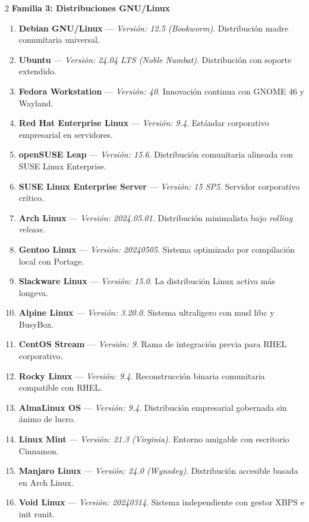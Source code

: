\documentclass[12pt]{article}
\begin{document}
\begin{multicols}{2}
\medskip
\noindent\textbf{Familia 3: Distribuciones GNU/Linux}\par\smallskip
\begin{enumerate}[label=\textbf{\arabic*.}, leftmargin=*, noitemsep, topsep=1pt, start=27]
    \item \textbf{Debian GNU/Linux} --- \textit{Versión: 12.5 (Bookworm)}. Distribución madre comunitaria universal.
    \item \textbf{Ubuntu} --- \textit{Versión: 24.04 LTS (Noble Numbat)}. Distribución con soporte extendido.
    \item \textbf{Fedora Workstation} --- \textit{Versión: 40}. Innovación continua con GNOME 46 y Wayland.
    \item \textbf{Red Hat Enterprise Linux} --- \textit{Versión: 9.4}. Estándar corporativo empresarial en servidores.
    \item \textbf{openSUSE Leap} --- \textit{Versión: 15.6}. Distribución comunitaria alineada con SUSE Linux Enterprise.
    \item \textbf{SUSE Linux Enterprise Server} --- \textit{Versión: 15 SP5}. Servidor corporativo crítico.
    \item \textbf{Arch Linux} --- \textit{Versión: 2024.05.01}. Distribución minimalista bajo \textit{rolling release}.
    \item \textbf{Gentoo Linux} --- \textit{Versión: 20240505}. Sistema optimizado por compilación local con Portage.
    \item \textbf{Slackware Linux} --- \textit{Versión: 15.0}. La distribución Linux activa más longeva.
    \item \textbf{Alpine Linux} --- \textit{Versión: 3.20.0}. Sistema ultraligero con musl libc y BusyBox.
    \item \textbf{CentOS Stream} --- \textit{Versión: 9}. Rama de integración previa para RHEL corporativo.
    \item \textbf{Rocky Linux} --- \textit{Versión: 9.4}. Reconstrucción binaria comunitaria compatible con RHEL.
    \item \textbf{AlmaLinux OS} --- \textit{Versión: 9.4}. Distribución empresarial gobernada sin ánimo de lucro.
    \item \textbf{Linux Mint} --- \textit{Versión: 21.3 (Virginia)}. Entorno amigable con escritorio Cinnamon.
    \item \textbf{Manjaro Linux} --- \textit{Versión: 24.0 (Wynsdey)}. Distribución accesible basada en Arch Linux.
    \item \textbf{Void Linux} --- \textit{Versión: 20240314}. Sistema independiente con gestor XBPS e init runit.

\end{enumerate}
\end{multicols}
\end{document}

